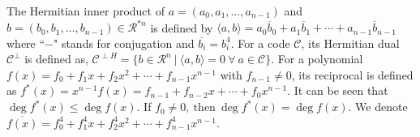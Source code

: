 \documentclass{amsart}
\theoremstyle{definition}
\theoremstyle{remark}
\numberwithin{equation}{section}
\begin{document}
  The Hermitian inner product of $a = (a_0,a_1,\dots,a_{n-1})$ and $ b=(b_0,b_1,\dots,b_{n-1}) \in \mathcal{R}^{*n}$ is defined by $ \langle a , b \rangle = a_0\overline{b}_0 + a_1\overline{b}_1 + \cdots + a_{n-1}\overline{b}_{n-1}  $ where ``$-$" stands for conjugation and $ \overline{b_i} = b_i^4 $. For a code $\mathcal{C}$, its Hermitian dual $\mathcal{C}^\perp$ is defined as, $ \mathcal{C}^{\perp H} = \{ b \in \mathcal{R}^n ~|~ \langle a, b \rangle =0 ~ \forall~ a \in \mathcal{C} \} $. For a polynomial $ f(x) = f_0 + f_1x + f_2x^2 + \cdots + f_{n-1}x^{n-1} $ with $ f_{n-1} \neq 0 $, its reciprocal is defined as $ f^*(x) = x^{n-1}f(x) = f_{n-1} + f_{n-2}x + \cdots + f_0x^{n-1} $. It can be seen that $ \deg{f^*(x)} \leq \deg{f(x)} $. If $f_0 \neq 0,~ \text{then}~ \deg{f^*(x) = \deg{f(x)}} $. We denote $ \overline{f(x)} = f_0^4 + f_1^4x + f_2^4x^2 + \cdots + f_{n-1}^4x^{n-1} $.
\end{document}
